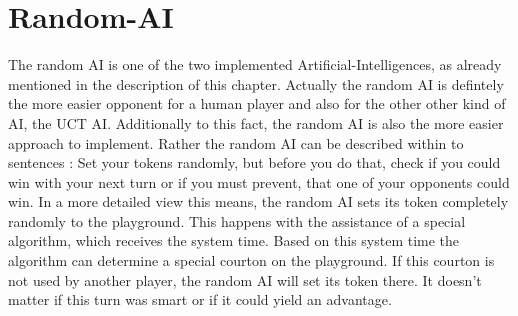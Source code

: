 \documentclass[english]{report}
\begin{document}
\section{Random-AI}
The random AI is one of the two implemented Artificial-Intelligences, as already mentioned in the description of this chapter. 
Actually the random AI is defintely the more easier opponent for a human player and also for the other other kind of AI, the UCT AI. 
Additionally to this fact, the random AI is also the more easier approach to implement. Rather the random AI can be described within to sentences : 
Set your tokens randomly, but before you do that, check if you could  win with your next turn or if you must prevent, that one of your opponents could win. 
In a more detailed view this means, the random AI sets its token completely randomly to the playground. This happens with the assistance of a special algorithm, 
which receives the system time. Based on this system time the algorithm can determine a special courton on the playground. If this courton is not used by 
another player, the random AI will set its token there. It doesn't matter if this turn was smart or if it could yield an advantage. 
\end{document}
